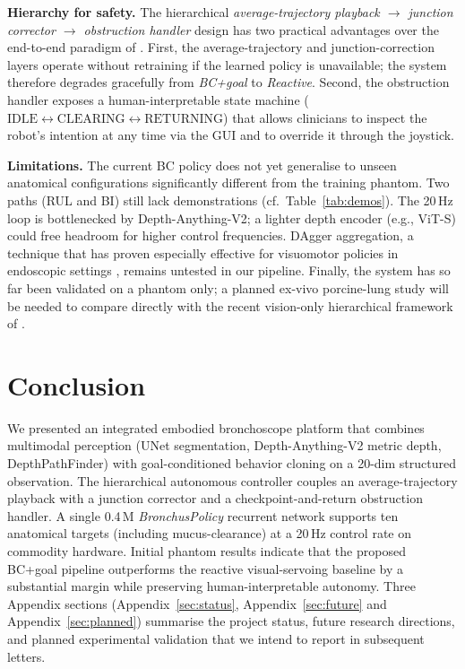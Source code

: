 \documentclass[journal,comsoc]{IEEEtran}
\begin{document}
\textbf{Hierarchy for safety.}
The hierarchical \emph{average-trajectory playback $\!\rightarrow\!$
junction corrector $\!\rightarrow\!$ obstruction handler} design has
two practical advantages over the end-to-end paradigm of
\cite{zhang2024aicopilot}. First, the average-trajectory and
junction-correction layers operate without retraining if the learned
policy is unavailable; the system therefore degrades gracefully from
\emph{BC+goal} to \emph{Reactive}. Second, the obstruction handler
exposes a human-interpretable state machine
($\text{IDLE}\!\leftrightarrow\!\text{CLEARING}\!\leftrightarrow\!\text{RETURNING}$)
that allows clinicians to inspect the robot's intention at any time
via the GUI and to override it through the joystick.

\textbf{Limitations.}
The current BC policy does not yet generalise to unseen anatomical
configurations significantly different from the training phantom.
Two paths (RUL and BI) still lack demonstrations (cf.\
Table~\ref{tab:demos}). The 20\,Hz loop is bottlenecked by
Depth-Anything-V2; a lighter depth encoder (e.g., ViT-S) could free
headroom for higher control frequencies. DAgger aggregation, a
technique that has proven especially effective for visuomotor policies
in endoscopic settings \cite{zhang2024aicopilot,ross2011dagger},
remains untested in our pipeline. Finally, the system has so far been
validated on a phantom only; a planned ex-vivo porcine-lung study
will be needed to compare directly with the recent vision-only
hierarchical framework of \cite{longshort2026}.

\section{Conclusion}
\label{sec:conclusion}

We presented an integrated embodied bronchoscope platform that
combines multimodal perception (UNet segmentation, Depth-Anything-V2
metric depth, DepthPathFinder) with goal-conditioned behavior
cloning on a 20-dim structured observation. The hierarchical
autonomous controller couples an average-trajectory playback with a
junction corrector and a checkpoint-and-return obstruction handler.
A single 0.4\,M \textit{BronchusPolicy} recurrent network supports
ten anatomical targets (including mucus-clearance) at a 20\,Hz
control rate on commodity hardware. Initial phantom results indicate
that the proposed BC+goal pipeline outperforms the reactive
visual-servoing baseline by a substantial margin while preserving
human-interpretable autonomy. Three Appendix sections
(Appendix~\ref{sec:status}, Appendix~\ref{sec:future} and
Appendix~\ref{sec:planned}) summarise the project status, future
research directions, and planned experimental validation that we
intend to report in subsequent letters.
\end{document}
